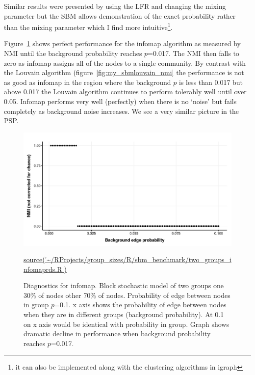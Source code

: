 Similar results were presented by \cite{yang2016comparative} using the LFR and changing the mixing parameter but the SBM allows demonstration of the exact probability rather than the mixing parameter which I find more intuitive\footnote{it can also be implemented along with the clustering algorithms in igraph}. 



Figure~\ref{fig:my_nice_infomap} shows perfect performance for the infomap algorithm as measured by NMI until the background probability reaches $p$=0.017. The NMI then falls to zero as infomap assigns all of the nodes to a single community. By contrast with the Louvain algorithm (figure~\ref{fig:my_sbmlouvain_nmi} the performance is not as good as infomap in the region where the background $p$ is less than 0.017 but above 0.017 the Louvain algorithm continues to perform tolerably well until over 0.05. Infomap performs very well (perfectly) when there is no `noise' but fails completely as background noise increases. We see a very similar picture in the PSP. 



\begin{figure}
    \centering
    \includegraphics[width=\textwidth]{images/chaptercommunity/ggplot2/sbm_benchmark/Rplot_infomap_sbmtwogroups_theme.png}
    \caption{Diagnostics for infomap. Block stochastic model of two groups one 30\% of nodes other 70\% of nodes. Probability of edge between nodes in group $p$=0.1. x axis shows the probability of edge between nodes when they are in different groups (background probability). At 0.1 on x axis would be identical with probability in group. Graph shows dramatic decline in performance when background probability reaches $p$=0.017.}
    \tiny\url{source('~/RProjects/group_sizes/R/sbm_benchmark/two_groups_infomaprds.R')}
    \label{fig:my_nice_infomap}
\end{figure}


